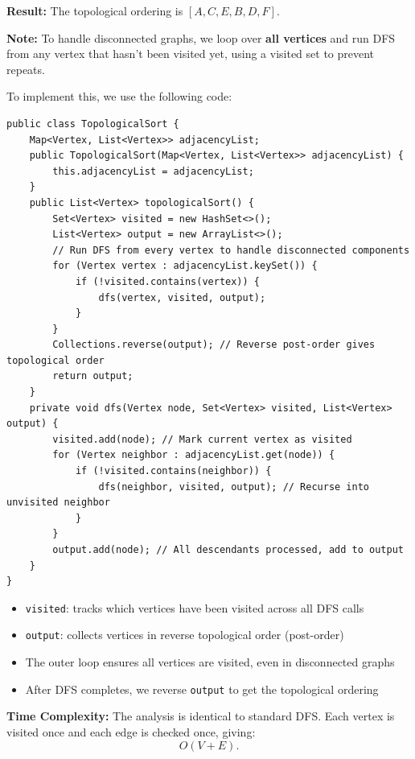 \textbf{Result:} The topological ordering is $[A, C, E, B, D, F]$.

\textbf{Note:} To handle disconnected graphs, we loop over \textbf{all vertices} and run DFS from any vertex that hasn't been visited yet, using a visited set to prevent repeats.


To implement this, we use the following code:

\begin{verbatim}
public class TopologicalSort {
    Map<Vertex, List<Vertex>> adjacencyList;
    public TopologicalSort(Map<Vertex, List<Vertex>> adjacencyList) {
        this.adjacencyList = adjacencyList;
    }
    public List<Vertex> topologicalSort() {
        Set<Vertex> visited = new HashSet<>();
        List<Vertex> output = new ArrayList<>();
        // Run DFS from every vertex to handle disconnected components
        for (Vertex vertex : adjacencyList.keySet()) {
            if (!visited.contains(vertex)) {
                dfs(vertex, visited, output);
            }
        }
        Collections.reverse(output); // Reverse post-order gives topological order
        return output;
    }
    private void dfs(Vertex node, Set<Vertex> visited, List<Vertex> output) {
        visited.add(node); // Mark current vertex as visited
        for (Vertex neighbor : adjacencyList.get(node)) {
            if (!visited.contains(neighbor)) {
                dfs(neighbor, visited, output); // Recurse into unvisited neighbor
            }
        }
        output.add(node); // All descendants processed, add to output
    }
}
\end{verbatim}

\begin{itemize}
  \item \texttt{visited}: tracks which vertices have been visited across all DFS calls
  \item \texttt{output}: collects vertices in reverse topological order (post-order)
  \item The outer loop ensures all vertices are visited, even in disconnected graphs
  \item After DFS completes, we reverse \texttt{output} to get the topological ordering
\end{itemize}

\textbf{Time Complexity:}
The analysis is identical to standard DFS. Each vertex is visited once and each edge is checked once, giving:
\[
O(V + E).
\]